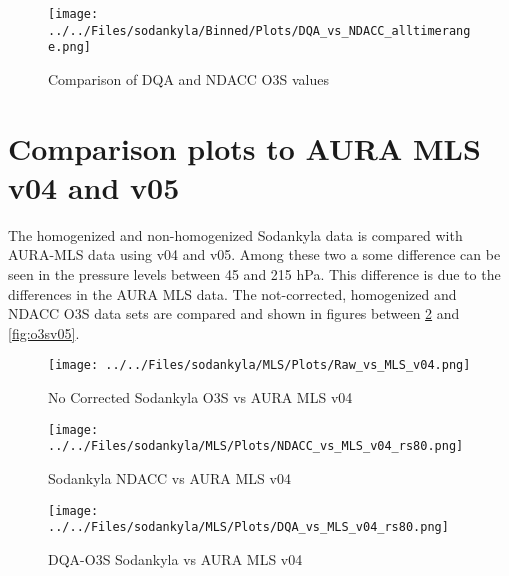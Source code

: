                         \begin{figure}
        \centering
\texttt{[image: ../../Files/sodankyla/Binned/Plots/DQA\_vs\_NDACC\_alltimerange.png]}
    \caption{Comparison of DQA and NDACC O3S values}
            \label{fig:fig_dqa_ndacc}
    \end{figure}


\section{Comparison plots to AURA MLS v04 and v05}

    The homogenized and non-homogenized Sodankyla data is compared with AURA-MLS data using v04 and v05. Among these two a some difference
    can be seen in the pressure levels between 45 and 215 hPa. This difference is due to the differences in the AURA MLS data.
    The not-corrected, homogenized and NDACC O3S data sets are compared and shown in figures between
\ref{fig:rawv04} and \ref{fig:o3sv05}.

                            \begin{figure}
        \centering
\texttt{[image: ../../Files/sodankyla/MLS/Plots/Raw\_vs\_MLS\_v04.png]}
    \caption{No Corrected Sodankyla O3S vs AURA MLS v04 }
            \label{fig:rawv04}
    \end{figure}

                                \begin{figure}
        \centering
\texttt{[image: ../../Files/sodankyla/MLS/Plots/NDACC\_vs\_MLS\_v04\_rs80.png]}
    \caption{ Sodankyla NDACC vs AURA MLS v04 }
            \label{fig:ndaccv04}
    \end{figure}


                                \begin{figure}
        \centering
\texttt{[image: ../../Files/sodankyla/MLS/Plots/DQA\_vs\_MLS\_v04\_rs80.png]}
    \caption{DQA-O3S Sodankyla vs AURA MLS v04 }
            \label{fig:o3sv04}
    \end{figure}

